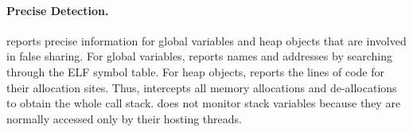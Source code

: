 \paragraph{Precise Detection.} \Cheetah{} reports precise information for global variables and heap objects that are involved in false sharing. For global variables, \Cheetah{} reports names and addresses by searching through the ELF symbol table. For heap objects, \Cheetah{} reports the lines of code for their allocation sites. Thus, \Cheetah{} intercepts all memory allocations and de-allocations to obtain the whole call stack. \cheetah{} does not monitor stack variables because they are normally accessed only by their hosting threads. 

 
